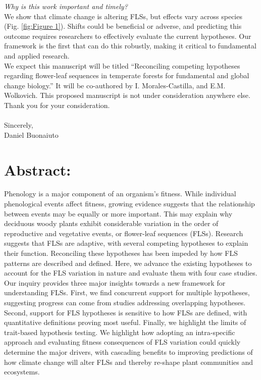 \documentclass[11pt,a4paper]{article}
\begin{document}
\noindent \emph{Why is this work important and timely?}\\

\noindent We show that climate change is altering FLSs, but effects vary across species (Fig. \ref{fig:Figure 1}). Shifts could be beneficial or adverse, and predicting this outcome requires researchers to effectively evaluate the current hypotheses. Our framework is the first that can do this robustly, making it critical to fundamental and applied research.\\

 \noindent We expect this manuscript will be titled ``Reconciling competing hypotheses regarding flower-leaf sequences in temperate forests for fundamental and global change biology.'' It will be co-authored by I. Morales-Castilla, and E.M. Wolkovich. This proposed manuscript is not under consideration anywhere else. Thank you for your consideration.\\
\\Sincerely,\\

Daniel Buonaiuto
\newpage
\section*{Abstract:}
Phenology is a major component of an organism's fitness. While individual phenological events affect fitness, growing evidence suggests that the relationship between events may be equally or more important. This may explain why deciduous woody plants exhibit considerable variation in the order of reproductive and vegetative events, or flower-leaf sequences (FLSs). Research suggests that FLSs are adaptive, with several competing hypotheses to explain their function. Reconciling these hypotheses has been impeded by how FLS patterns are described and defined. Here, we advance the existing hypotheses to account for the FLS variation in nature and evaluate them with four case studies. Our inquiry provides three major insights towards a new framework for understanding FLSs. First, we find concurrent support for multiple hypotheses, suggesting progress can come from studies addressing overlapping hypotheses. Second, support for FLS hypotheses is sensitive to how FLSs are defined, with quantitative definitions proving most useful. Finally, we highlight the limits of trait-based hypothesis testing. We highlight how adopting an intra-specific approach and evaluating fitness consequences of FLS variation could quickly determine the major drivers, with cascading benefits to improving predictions of how climate change will alter FLSs and thereby re-shape plant communities and ecosystems. 
\end{document}
